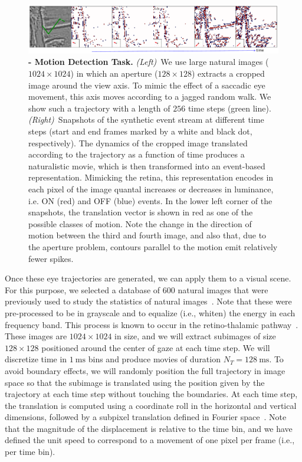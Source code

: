 \documentclass[default]{sn-jnl}%
\theoremstyle{thmstyleone}%
\theoremstyle{thmstyletwo}%
\theoremstyle{thmstylethree}%
\newcommand{\ms}{\si{\milli\second}}%
\begin{document}
\begin{figure}%
    \centering
    \includegraphics[width=0.95\linewidth]{figures/motion_task.pdf}
    \caption{
        {\bf - Motion Detection Task.} \textit{(Left)}~We use large natural images ($1024\times1024$) in which an aperture ($128\times128$) extracts a cropped image around the view axis. To mimic the effect of a saccadic eye movement, this axis moves according to a jagged random walk. We show such a trajectory with a length of $256$ time steps (green line). \textit{(Right)}~Snapshots of the synthetic event stream at different time steps (start and end frames marked by a white and black dot, respectively). The dynamics of the cropped image translated according to the trajectory as a function of time produces a naturalistic movie, which is then transformed into an event-based representation. Mimicking the retina, this representation encodes in each pixel of the image quantal increases or decreases in luminance, i.e. ON (red) and OFF (blue) events. In the lower left corner of the snapshots, the translation vector is shown in red as one of the possible classes of motion. Note the change in the direction of motion between the third and fourth image, and also that, due to the aperture problem, contours parallel to the motion emit relatively fewer spikes.
        }
    \label{fig:motion_task}
\end{figure}
Once these eye trajectories are generated, we can apply them to a visual scene. For this purpose, we selected a database of $600$ natural images that were previously used to study the statistics of natural images~\citep{perrinet_edge_2015}. Note that these were pre-processed to be in grayscale and to equalize (i.e., whiten) the energy in each frequency band. This process is known to occur in the retino-thalamic pathway~\citep{dan_efficient_1996}. These images are $1024 \times 1024$ in size, and we will extract subimages of size $128 \times 128$ positioned around the center of gaze at each time step. We will discretize time in $1~\ms$ bins and produce movies of duration $N_T = 128~\ms$. To avoid boundary effects, we will randomly position the full trajectory in image space so that the subimage is translated using the position given by the trajectory at each time step without touching the boundaries. At each time step, the translation is computed using a coordinate roll in the horizontal and vertical dimensions, followed by a subpixel translation defined in Fourier space~\citep{perrinet_sparse_2015}. Note that the magnitude of the displacement is relative to the time bin, and we have defined the unit speed to correspond to a movement of one pixel per frame (i.e., per time bin).
\end{document}
